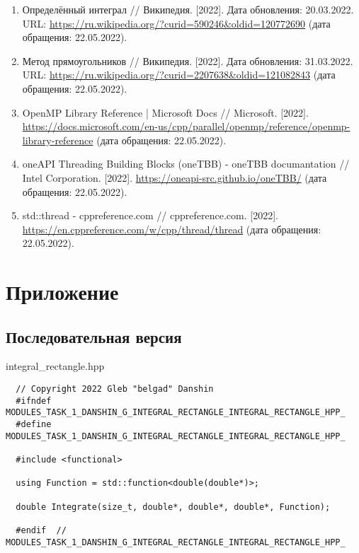 \documentclass{report}
\begin{document}
\begin{enumerate}
  \item Определённый интеграл // Википедия. [2022]. Дата обновления: 20.03.2022. URL: \url{https://ru.wikipedia.org/?curid=590246&oldid=120772690} (дата обращения: 22.05.2022).
  \item Метод прямоугольников // Википедия. [2022]. Дата обновления: 31.03.2022. URL: \url{https://ru.wikipedia.org/?curid=2207638&oldid=121082843} (дата обращения: 22.05.2022).
  \item OpenMP Library Reference | Microsoft Docs // Microsoft. [2022]. \url{https://docs.microsoft.com/en-us/cpp/parallel/openmp/reference/openmp-library-reference} (дата обращения: 22.05.2022).
  \item oneAPI Threading Building Blocks (oneTBB) - oneTBB documantation // Intel Corporation. [2022]. \url{https://oneapi-src.github.io/oneTBB/} (дата обращения: 22.05.2022).
  \item std::thread - cppreference.com // cppreference.com. [2022]. \url{https://en.cppreference.com/w/cpp/thread/thread} (дата обращения: 22.05.2022).
\end{enumerate}

\clearpage

\section*{Приложение}

\subsection*{Последовательная версия}

integral\_rectangle.hpp
\begin{lstlisting}
  // Copyright 2022 Gleb "belgad" Danshin
  #ifndef MODULES_TASK_1_DANSHIN_G_INTEGRAL_RECTANGLE_INTEGRAL_RECTANGLE_HPP_
  #define MODULES_TASK_1_DANSHIN_G_INTEGRAL_RECTANGLE_INTEGRAL_RECTANGLE_HPP_
  
  #include <functional>
  
  using Function = std::function<double(double*)>;
  
  double Integrate(size_t, double*, double*, double*, Function);
  
  #endif  // MODULES_TASK_1_DANSHIN_G_INTEGRAL_RECTANGLE_INTEGRAL_RECTANGLE_HPP_
\end{lstlisting}
\end{document}
